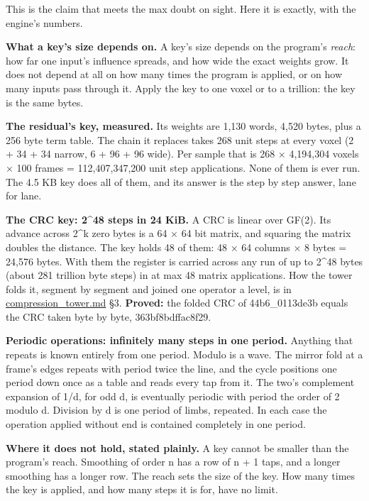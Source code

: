 This is the claim that meets the max doubt on sight. Here it is exactly, with the engine's numbers.

\textbf{What a key's size depends on.} A key's size depends on the program's \emph{reach}: how far one input's influence spreads, and how wide the exact weights grow. It does not depend at all on how many times the program is applied, or on how many inputs pass through it. Apply the key to one voxel or to a trillion: the key is the same bytes.

\textbf{The residual's key, measured.} Its weights are 1,130 words, 4,520 bytes, plus a 256 byte term table. The chain it replaces takes 268 unit steps at every voxel (2 + 34 + 34 narrow, 6 + 96 + 96 wide). Per sample that is 268 × 4,194,304 voxels × 100 frames = 112,407,347,200 unit step applications. None of them is ever run. The 4.5 KB key does all of them, and its answer is the step by step answer, lane for lane.

\textbf{The CRC key: 2\textasciicircum{}48 steps in 24 KiB.} A CRC is linear over GF(2). Its advance across 2\textasciicircum{}k zero bytes is a 64 × 64 bit matrix, and squaring the matrix doubles the distance. The key holds 48 of them: 48 × 64 columns × 8 bytes = 24,576 bytes. With them the register is carried across any run of up to 2\textasciicircum{}48 bytes (about 281 trillion byte steps) in at max 48 matrix applications. How the tower folds it, segment by segment and joined one operator a level, is in \hyperref[chap:compression-tower]{compression\_\allowbreak{}tower.md} §3. \textbf{Proved:} the folded CRC of 44b6\_\allowbreak{}0113de3b equals the CRC taken byte by byte, 363bf8bdffac8f29.

\textbf{Periodic operations: infinitely many steps in one period.} Anything that repeats is known entirely from one period. Modulo is a wave. The mirror fold at a frame's edges repeats with period twice the line, and the cycle positions one period down once as a table and reads every tap from it. The two's complement expansion of 1/d, for odd d, is eventually periodic with period the order of 2 modulo d. Division by d is one period of limbs, repeated. In each case the operation applied without end is contained completely in one period.

\textbf{Where it does not hold, stated plainly.} A key cannot be smaller than the program's reach. Smoothing of order n has a row of n + 1 taps, and a longer smoothing has a longer row. The reach sets the size of the key. How many times the key is applied, and how many steps it is for, have no limit.

